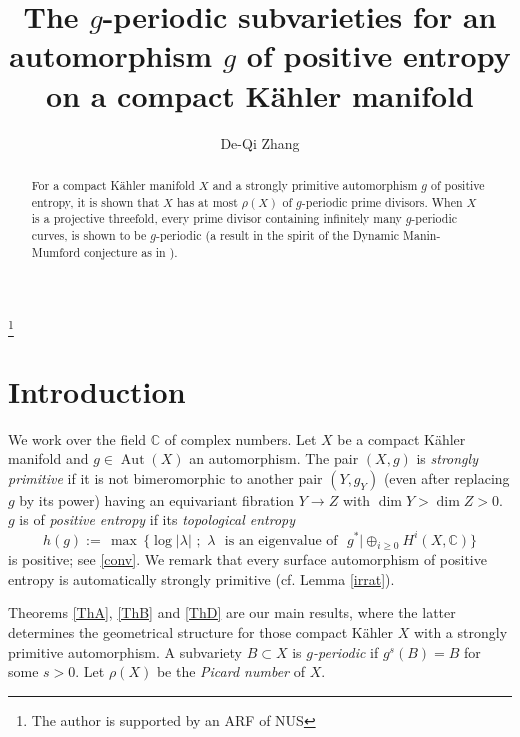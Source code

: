 \documentclass[11pt,a4paper,psamsfonts]{amsart}
\theoremstyle{plain}
\theoremstyle{definition}
\theoremstyle{remark}
\begin{document}
\title[The periodic subvarieties]{The $g$-periodic subvarieties for an automorphism $g$ of positive entropy on a compact K\"ahler manifold}
\author{De-Qi Zhang}
\address
{\textsc{Department of Mathematics} \endgraf
\textsc{National University of Singapore, 2 Science Drive 2,
Singapore 117543}}

\begin{abstract}
For a compact K\"ahler manifold $X$ and a strongly primitive automorphism $g$
of positive entropy, it is shown that
$X$ has at most $\rho(X)$ of
$g$-periodic prime divisors.
When $X$ is a projective threefold, every prime divisor
containing infinitely many $g$-periodic curves, is shown to be $g$-periodic
(a result in the spirit of the Dynamic Manin-Mumford conjecture as in \cite{Zs}).

\end{abstract}


\thanks{The author is supported by an ARF of NUS}

\maketitle

\section{Introduction}

We work over the field ${\mathbb{C}}$ of complex numbers.
Let $X$ be a compact K\"ahler manifold and
$g \in {\operatorname{Aut}}(X)$ an automorphism.
The pair $(X, g)$ is {\it strongly primitive}
if it is not bimeromorphic to another pair $(Y, g_Y)$
(even after replacing $g$ by its power)
having an equivariant fibration $Y \to Z$ with $\dim Y > \dim Z > 0$.
$g$ is of {\it positive entropy} if its {\it topological entropy} 
$$h(g) := \, \max \, \{ \log |\lambda| \,\,; \,\,
\lambda \,\,\,\, \text{is an eigenvalue of} \,\,\,\, g^* | \oplus_{i \ge 0} H^i(X, {\mathbb{C}}) \}$$
is positive; see \ref{conv}.
We remark that every surface automorphism of positive entropy
is automatically strongly primitive (cf. Lemma \ref{irrat}).

Theorems \ref{ThA}, \ref{ThB} and \ref{ThD} are our
main results, where the latter determines the geometrical structure
for those compact K\"ahler $X$ with a strongly primitive automorphism.
A subvariety $B \subset X$ is {\it $g$-periodic} if $g^s(B) = B$ for some $s > 0$.
Let $\rho(X)$ be the {\it Picard number} of $X$.
\end{document}
